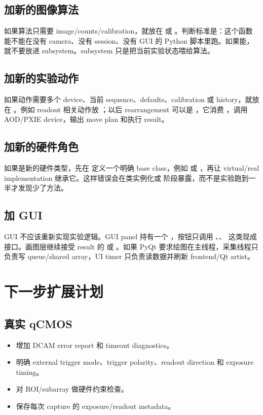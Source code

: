 \documentclass[11pt,oneside,openany]{book}
\begin{document}
\section{加新的图像算法}
如果算法只需要 image/counts/calibration，就放在  或 。判断标准是：这个函数能不能在没有 camera、没有 session、没有 GUI 的 Python 脚本里跑。如果能，就不要放进 subsystem。subsystem 只是把当前实验状态喂给算法。

\section{加新的实验动作}
如果动作需要多个 device、当前 sequence、defaults、calibration 或 history，就放在 。例如 readout 相关动作放 ；以后 rearrangement 可以是 ，它消费 ，调用 AOD/PXIE device，输出 move plan 和执行 result。

\section{加新的硬件角色}
如果是新的硬件类型，先在  定义一个明确 base class，例如  或 ，再让 virtual/real implementation 继承它。这样错误会在类实例化或  阶段暴露，而不是实验跑到一半才发现少了方法。

\section{加 GUI}
GUI 不应该重新实现实验逻辑。GUI panel 持有一个 ，按钮只调用 、、 这类现成接口。画图层继续接受 result 的  或 。如果 PyQt 要求绘图在主线程，采集线程只负责写 queue/shared array，UI timer 只负责读数据并刷新 frontend/Qt artist。

\chapter{下一步扩展计划}
\section{真实 qCMOS}
\begin{itemize}
  \item 增加 DCAM error report 和 timeout diagnostics。
  \item 明确 external trigger mode、trigger polarity、readout direction 和 exposure timing。
  \item 对 ROI/subarray 做硬件约束检查。
  \item 保存每次 capture 的 exposure/readout metadata。
\end{itemize}
\end{document}
